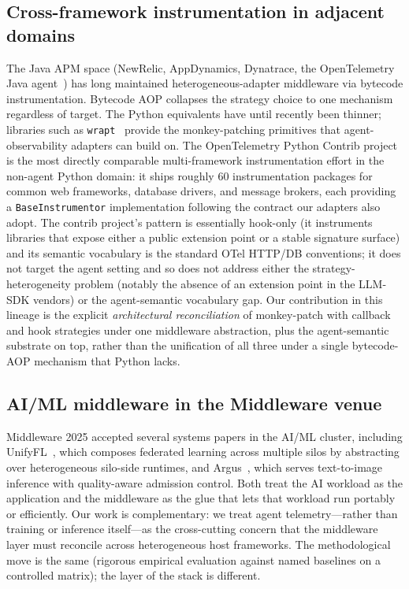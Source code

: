 \documentclass[sigconf,review,anonymous,9pt]{acmart}
\begin{document}
\subsection{Cross-framework instrumentation in adjacent domains}
The Java APM space (NewRelic, AppDynamics, Dynatrace, the
OpenTelemetry Java agent~\cite{otel_java_agent}) has long maintained
heterogeneous-adapter middleware via bytecode instrumentation.
Bytecode AOP collapses the strategy choice to one mechanism
regardless of target. The Python equivalents have until recently
been thinner; libraries such as \texttt{wrapt}~\cite{wrapt} provide
the monkey-patching primitives that agent-observability adapters
can build on. The OpenTelemetry Python Contrib
project~\cite{otel_contrib_python} is the most directly comparable
multi-framework instrumentation effort in the non-agent Python
domain: it ships roughly 60 instrumentation packages for common web
frameworks, database drivers, and message brokers, each providing a
\texttt{BaseInstrumentor} implementation following the contract our
adapters also adopt. The contrib project's pattern is essentially
hook-only (it instruments libraries that expose either a public
extension point or a stable signature surface) and its semantic
vocabulary is the standard OTel HTTP/DB conventions; it does not
target the agent setting and so does not address either the
strategy-heterogeneity problem (notably the absence of an
extension point in the LLM-SDK vendors) or the agent-semantic
vocabulary gap. Our contribution in this lineage is the explicit
\emph{architectural reconciliation} of monkey-patch with callback
and hook strategies under one middleware abstraction, plus the
agent-semantic substrate on top, rather than the unification of all
three under a single bytecode-AOP mechanism that Python lacks.

\subsection{AI/ML middleware in the Middleware venue}
Middleware 2025 accepted several systems papers in the AI/ML
cluster, including UnifyFL~\cite{unifyfl}, which composes federated
learning across multiple silos by abstracting over heterogeneous
silo-side runtimes, and Argus~\cite{argus}, which serves
text-to-image inference with quality-aware admission control. Both
treat the AI workload as the application and the middleware as the
glue that lets that workload run portably or efficiently. Our work
is complementary: we treat agent telemetry---rather than training or
inference itself---as the cross-cutting concern that the
middleware layer must reconcile across heterogeneous host
frameworks. The methodological move is the same (rigorous
empirical evaluation against named baselines on a controlled
matrix); the layer of the stack is different.
\end{document}
